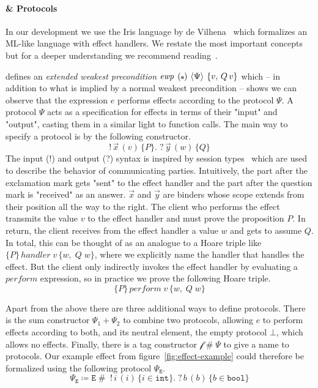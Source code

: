 \paragraph{\hazel{} \& Protocols}
In our development we use the Iris language \hazel{} by de Vilhena~\cite{de2021separation,de2022proof} which formalizes an ML-like language with effect handlers.
We restate the most important concepts but for a deeper understanding we recommend reading~\cite{de2021separation}.

\hazel{} defines an \emph{extended weakest precondition} \(\ewp{e}{\Psi}{v,\, Q\, v}\) which -- in addition to what is implied by a normal weakest precondition --
shows we can observe that the expression \(e\) performs effects according to the protocol \(\Psi\).
A protocol \(\Psi\) acts as a specification for effects in terms of their "input" and "output", casting them in a similar light to function calls.
The main way to specify a protocol is by the following constructor.
\[
    !\, \overrightarrow{x}\, (v)\, \{P\}.\; ?\, \overrightarrow{y}\, (w)\, \{Q\}
\]
The input (!) and output (?) syntax is inspired by session types~\cite{sestypes} which are used to describe the behavior of communicating parties.
Intuitively, the part after the exclamation mark gets "sent" to the effect handler and the part after the question mark is "received" as an answer.
\(\overrightarrow{x}\) and \(\overrightarrow{y}\) are binders whose scope extends from their position all the way to the right.
The client who performs the effect transmits the value \(v\) to the effect handler and must prove the proposition \(P\).
In return, the client receives from the effect handler a value \(w\) and gets to assume \(Q\).
In total, this can be thought of as an analogue to a Hoare triple like \(\{P\}\, handler\; v\, \{w,\; Q\; w\}\), where we explicitly name the handler that handles the effect.
But the client only indirectly invokes the effect handler by evaluating a \(perform\) expression, so in practice we prove the following Hoare triple.
\[
    \{P\}\, perform\; v\, \{w,\; Q\; w\}
\]

Apart from the above there are three additional ways to define protocols.
There is the sum constructor \(\Psi_1 + \Psi_2\) to combine two protocols, allowing \(e\) to perform effects according to both, and its neutral element, the empty protocol \(\bot\),
which allows no effects.
Finally, there is a tag constructor \(\mathcal{f} \mathop{\#} \Psi\) to give a name to protocols.
Our example effect  from figure~\ref{fig:effect-example} could therefore be formalized using the following protocol \(\Psi_\mathtt{E}\).
\[
    \Psi_\mathtt{E} \coloneq \mathtt{E} \mathop{\#}\; !\, i\, (i)\, \{ i \in \mathtt{int} \}.\; ?\, b\, (b)\, \{ b \in \mathtt{bool} \}
\]

